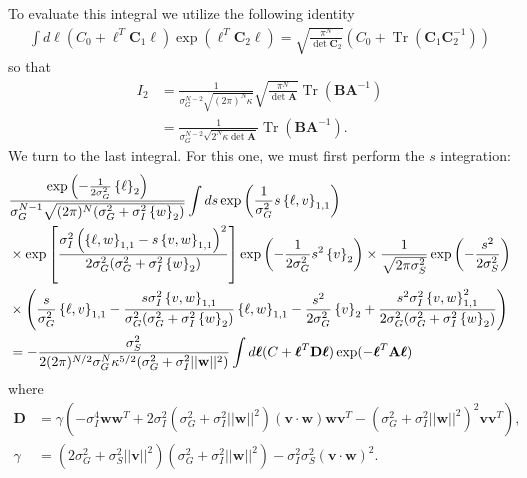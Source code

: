 \documentclass[11pt]{article}
\DeclareMathOperator{\Tr}{Tr}
\begin{document}
To evaluate this integral we utilize the following identity
\begin{align}
\int d\boldsymbol{\ell} \left(C_0 +\boldsymbol{\ell}^T \mathbf{C}_1 \boldsymbol{\ell}\right)\exp\left(\boldsymbol{\ell}^T \mathbf{C}_2 \boldsymbol{\ell}\right) = \sqrt{\frac{\pi^N}{\det \mathbf{C}_2}}\left(C_0 + \Tr\left(\mathbf{C}_1\mathbf{C}_2^{-1}\right)\right)
\end{align}
so that
\begin{align}
	I_2 &= \frac{1}{\sigma_G^{N-2}\sqrt{(2\pi)^N \kappa}} \sqrt{\frac{\pi^N}{\det \mathbf{A}}} \Tr(\mathbf{B} \mathbf{A}^{-1}) \\
	&= \frac{1}{\sigma_G^{N-2} \sqrt{2^N \kappa \det \mathbf{A}}}\Tr(\mathbf{B} \mathbf{A}^{-1}).
\end{align}
We turn to the last integral. For this one, we must first perform the $s$ integration: 
\begin{align}
	&\frac{\exp\left(-\frac{1}{2\sigma_G^2}\left\{\ell \right\}_2\right)}{\sigma_G^{N-1}\sqrt{(2\pi)^N(\sigma_G^2 + \sigma_I^2 \left\{w\right\}_2)}} \int ds \exp\left(\frac{1}{\sigma_G^2} s\left\{\ell, v\right\}_{1,1}\right) \notag \\
	&\times \exp\left[\frac{\sigma_I^2\left(\left\{\ell, w\right\}_{1,1} - s \left\{v,w\right\}_{1,1}\right)^2}{2\sigma_G^2 (\sigma_G^2 + \sigma_I^2 \left\{w\right\}_2)}\right]\exp\left(-\frac{1}{2\sigma_G^2}s^2 \left\{v\right\}_2\right)\times \frac{1}{\sqrt{2\pi \sigma_S^2}} \exp\left(-\frac{s^2}{2\sigma_S^2}\right) \notag \\
	&\times \left(\frac{s}{\sigma_G^2} \left\{\ell, v\right\}_{1,1} - \frac{s \sigma_I^2 \left\{v,w\right\}_{1,1}}{\sigma_G^2 (\sigma_G^2 + \sigma_I^2 \left\{w\right\}_2)}\left\{\ell, w\right\}_{1,1} - \frac{s^2}{2\sigma_G^2} \left\{v\right\}_2   + \frac{s^2 \sigma_I^2 \left\{v,w\right\}_{1,1}^2}{2\sigma_G^2 (\sigma_G^2 + \sigma_I^2 \left\{w\right\}_2)}\right) \\
	&= -\frac{\sigma_S^2}{2(2\pi)^{N/2} \sigma_G^N \kappa^{5/2} (\sigma_G^2 + \sigma_I^2 ||\mathbf{w}||^2)}\int d\boldsymbol{\ell}(C + \boldsymbol{\ell}^T \mathbf{D} \boldsymbol{\ell})\exp(-\boldsymbol{\ell}^T \mathbf{A} \boldsymbol{\ell})
\end{align}
where
\begin{align}
	\mathbf{D} &= \gamma \left(-\sigma_I^4 \mathbf{ww}^T+ 2\sigma_I^2 (\sigma_G^2 + \sigma_I^2 ||\mathbf{w}||^2)(\mathbf{v} \cdot \mathbf{w})\mathbf{wv}^T -(\sigma_G^2 + \sigma_I^2 ||\mathbf{w}||^2)^2 \mathbf{vv}^T\right),\\
	\gamma &= (2\sigma_G^2 + \sigma_S^2 ||\mathbf{v}||^2)(\sigma_G^2 + \sigma_I^2 ||\mathbf{w}||^2) - \sigma_I^2 \sigma_S^2 (\mathbf{v}\cdot \mathbf{w})^2.
\end{align}
\end{document}
